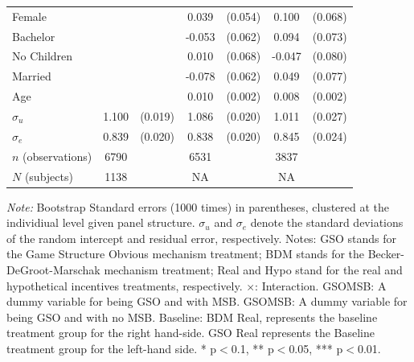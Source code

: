 \documentclass[12pt]{article}
\newcommand{\sym}[1]{\rlap{$^{#1}$}}
\begin{document}
\begin{table}[H]
{\begin{tabular}{l*{3}{cc}}
Female      &                     &            &       0.039         &     (0.054)&       0.100         &     (0.068)\\
Bachelor    &                     &            &      -0.053         &     (0.062)&       0.094         &     (0.073)\\
No Children &                     &            &       0.010         &     (0.068)&      -0.047         &     (0.080)\\
Married     &                     &            &      -0.078         &     (0.062)&       0.049         &     (0.077)\\
Age         &                     &            &       0.010\sym{***}&     (0.002)&       0.008\sym{***}&     (0.002)\\
$\sigma_u $    &       1.100\sym{***}&     (0.019)&       1.086\sym{***}&     (0.020)&       1.011\sym{***}&     (0.027)\\
$\sigma_e$     &       0.839\sym{***}&     (0.020)&       0.838\sym{***}&     (0.020)&       0.845\sym{***}&     (0.024)\\


\hline
\(n\) (observations)      &        6790         &            &        6531         &            &        3837         &            \\

\(N\) (subjects)       &        1138         &            &       NA         &            &        NA       &            \\
\hline\hline
\end{tabular}
}


\begin{tablenotes}
            \footnotesize
            \item \textit{Note:} Bootstrap Standard errors (1000 times) in parentheses, clustered at the individiual level given panel structure. $\sigma_u$ and $\sigma_e$ denote the standard deviations of the random intercept and residual error, respectively. Notes: GSO stands for the Game Structure Obvious mechanism treatment; BDM stands for the Becker-DeGroot-Marschak mechanism treatment; Real and Hypo stand for the real and hypothetical incentives treatments, respectively. $\times$: Interaction. GSOMSB: A dummy variable for being GSO and with MSB. GSOMSB: A dummy variable for being GSO and with no MSB. Baseline: BDM Real, represents the baseline treatment group for the right hand-side. GSO Real represents the Baseline treatment group for the left-hand side. * p$<$0.1, ** p$<$0.05, *** p$<$0.01.
        \end{tablenotes}

\end{table}
\end{document}
